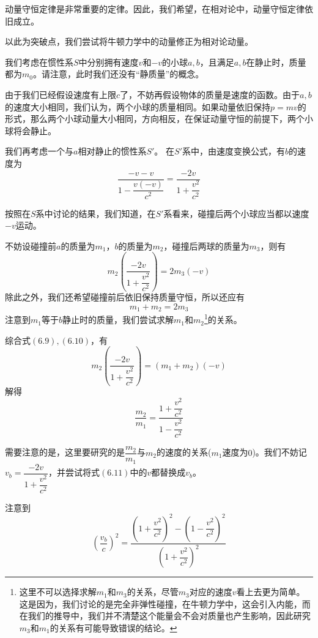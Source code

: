 \begin{prove}[$p=\gamma mv$]
	动量守恒定律是非常重要的定律。因此，我们希望，在相对论中，动量守恒定律依旧成立。
	
	以此为突破点，我们尝试将牛顿力学中的动量修正为相对论动量。
	
	我们考虑在惯性系$S$中分别拥有速度$v$和$-v$的小球$a,b$，且满足$a,b$在静止时，质量都为$m_0$。请注意，此时我们还没有``静质量''的概念。
	
	由于我们已经假设速度有上限$c$了，不妨再假设物体的质量是速度的函数。由于$a,b$的速度大小相同，我们认为，两个小球的质量相同。如果动量依旧保持$p=mv$的形式，那么两个小球动量大小相同，方向相反，在保证动量守恒的前提下，两个小球将会静止。
	
	我们再考虑一个与$a$相对静止的惯性系$S'$。
	在$S'$系中，由速度变换公式，有$b$的速度为
	\[\dfrac{-v-v}{1-\dfrac{v(-v)}{c^2}}=\dfrac{-2v}{1+\dfrac{v^2}{c^2}}\]
	
	按照在$S$系中讨论的结果，我们知道，在$S'$系看来，碰撞后两个小球应当都以速度$-v$运动。
	
	不妨设碰撞前$a$的质量为$m_1$，$b$的质量为$m_2$，碰撞后两球的质量为$m_3$，则有
	\begin{equation}
		m_2\left(\dfrac{-2v}{1+\dfrac{v^2}{c^2}}\right)=2m_3(-v)
	\end{equation}
	除此之外，我们还希望碰撞前后依旧保持质量守恒，所以还应有
	\begin{equation}
		m_1+m_2=2m_3
	\end{equation}
	注意到$m_1$等于$b$静止时的质量，我们尝试求解$m_1$和$m_2$\footnote{这里不可以选择求解$m_1$和$m_3$的关系，尽管$m_3$对应的速度$v$看上去更为简单。这是因为，我们讨论的是完全非弹性碰撞，在牛顿力学中，这会引入内能，而在我们的推导中，我们并不清楚这个能量会不会对质量也产生影响，因此研究$m_3$和$m_1$的关系有可能导致错误的结论。}的关系。
	
	综合式$(6.9),(6.10)$，有
	\[m_2\left(\dfrac{-2v}{1+\dfrac{v^2}{c^2}}\right)=(m_1+m_2)(-v)\]
	解得
	\begin{equation}
		\dfrac{m_2}{m_1}=\dfrac{1+\dfrac{v^2}{c^2}}{1-\dfrac{v^2}{c^2}}
	\end{equation}
	
	需要注意的是，这里要研究的是$\dfrac{m_2}{m_1}$与$m_2$的速度的关系($m_1$速度为$0$)。我们不妨记$v_b=\dfrac{-2v}{1+\dfrac{v^2}{c^2}}$，并尝试将式$(6.11)$中的$v$都替换成$v_b$。
	
	注意到
	\[\left(\dfrac{v_b}{c}\right)^2=\dfrac{\left(1+\dfrac{v^2}{c^2}\right)^2-\left(1-\dfrac{v^2}{c^2}\right)^2}{\left(1+\dfrac{v^2}{c^2}\right)^2}\]
	

\end{prove}
